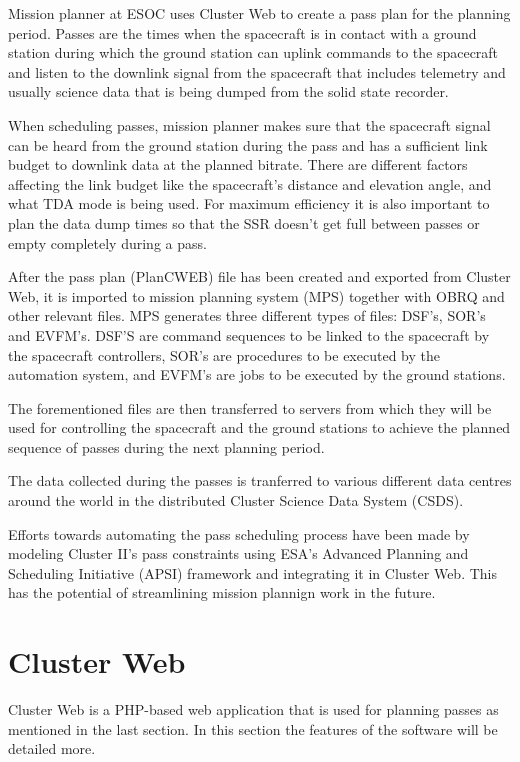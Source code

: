 Mission planner at ESOC uses Cluster Web to create a pass plan for the planning period. Passes are the times when the spacecraft is in contact with a ground station during which the ground station can uplink commands to the spacecraft and listen to the downlink signal from the spacecraft that includes telemetry and usually science data that is being dumped from the solid state recorder.

When scheduling passes, mission planner makes sure that the spacecraft signal can be heard from the ground station during the pass and has a sufficient link budget to downlink data at the planned bitrate. There are different factors affecting the link budget like the spacecraft's distance and elevation angle, and what TDA mode is being used. For maximum efficiency it is also important to plan the data dump times so that the SSR doesn't get full between passes or empty completely during a pass.

After the pass plan (PlanCWEB) file has been created and exported from Cluster Web, it is imported to mission planning system (MPS) together with OBRQ and other relevant files. MPS generates three different types of files: DSF's, SOR's and EVFM's. DSF'S are command sequences to be linked to the spacecraft  by the spacecraft controllers, SOR's are procedures to be executed by the automation system, and EVFM's are jobs to be executed by the ground stations.

The forementioned files are then transferred to servers from which they will be used for controlling the spacecraft and the ground stations to achieve the planned sequence of passes during the next planning period.

The data collected during the passes is tranferred to various different data centres around the world in the distributed Cluster Science Data System (CSDS).

Efforts towards automating the pass scheduling process have been made by modeling Cluster II's pass constraints using ESA's Advanced Planning and Scheduling Initiative (APSI) framework and integrating it in Cluster Web. This has the potential of streamlining mission plannign work in the future. \cite{farber2016automation}

\cite{esasci, esacluster}

\section{Cluster Web}\label{clusterweb_section}
Cluster Web is a PHP-based web application that is used for planning passes as mentioned in the last section. In this section the features of the software will be detailed more.

